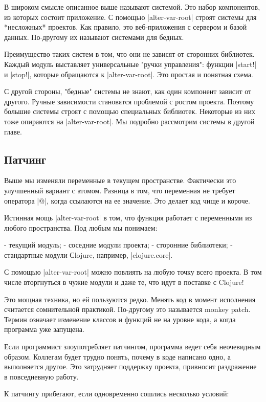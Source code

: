 В широком смысле описанное выше называют системой. Это набор компонентов, из
которых состоит приложение. С помощью \spverb|alter-var-root| строят системы для
*несложных* проектов. Как правило, это веб-приложения с сервером и базой
данных. По-другому их называют системами для бедных.

Преимущество таких систем в том, что они не зависят от сторонних
библиотек. Каждый модуль выставляет универсальные "ручки управления": функции
\spverb|start!| и \spverb|stop!|, которые обращаются к \spverb|alter-var-root|. Это простая и
понятная схема.

С другой стороны, "бедные" системы не знают, как один компонент зависит от
другого. Ручные зависимости становятся проблемой с ростом проекта. Поэтому
большие системы строят с помощью специальных библиотек. Некоторые из них тоже
опираются на \spverb|alter-var-root|. Мы подробно рассмотрим системы в другой главе.

\subsection{Патчинг}

Выше мы изменяли переменные в текущем пространстве. Фактически это улучшенный
вариант с атомом. Разница в том, что переменная не требует оператора \spverb|@|, когда
ссылаются на ее значение. Это делает код чище и короче.

Истинная мощь \spverb|alter-var-root| в том, что функция работает с переменными из
любого пространства. Под любым мы понимаем:

- текущий модуль;
- соседние модули проекта;
- сторонние библиотеки;
- стандартные модули Сlojure, например, \spverb|clojure.core|.

С помощью \spverb|alter-var-root| можно повлиять на любую точку всего проекта. В том
числе вторгнуться в чужие модули и даже те, что идут в поставке с Clojure!

Это мощная техника, но ей пользуются редко. Менять код в момент исполнения
считается сомнительной практикой. По-другому это называется monkey patch. Термин
означает изменение классов и функций не на уровне кода, а когда программа уже
запущена.

Если программист злоупотребляет патчингом, программа ведет себя неочевидным
образом. Коллегам будет трудно понять, почему в коде написано одно, а
выполняется другое. Это затрудняет поддержку проекта, привносит раздражение в
повседневную работу.

К патчингу прибегают, если одновременно сошлись несколько условий:

